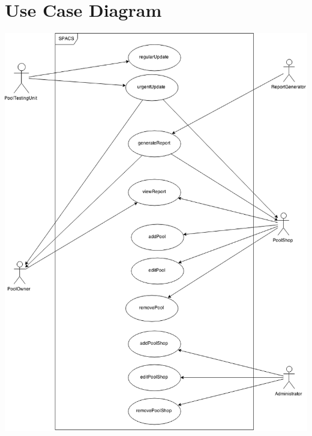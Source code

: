 \newcommand{\usecase}[7]{
\begin{center}
\begin{tabular}[h!]{| l | p{13cm} |}
	\hline
	\textbf{Name} & #1 \\ \hline
	\textbf{Actors} & #2 \\ \hline
	\textbf{Goal} & #3 \\ \hline
	\textbf{Preconditions} & #4 \\ \hline
	\textbf{Basic Flow} & #5 \\ \hline
	\textbf{Alternative Flow} & #6 \\ \hline
	\textbf{Postconditions} & #7 \\ \hline
\end{tabular}
\end{center}
}

\section{Use Case Diagram}

\begin{center}
	\includegraphics[width=15cm]{images/UseCaseDiagram}
\end{center}

